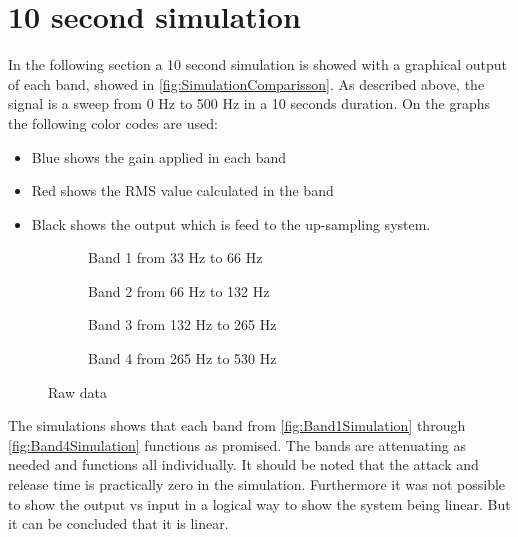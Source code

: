 \section{10 second simulation}
In the following section a 10 second simulation is showed with a graphical output of each band, showed in \autoref{fig:SimulationComparisson}. As described above, the signal is a sweep from 0 Hz to 500 Hz in a 10 seconds duration. On the graphs the following color codes are used:
\begin{itemize}
\item Blue shows the gain applied in each band
\item Red shows the RMS value calculated in the band
\item Black shows the output which is feed to the up-sampling system.
\end{itemize}

\begin{figure}[H]
\centering
\begin{subfigure}[t]{0.49\textwidth}
    \centering
    
    \caption{Band 1 from 33 Hz to 66 Hz}
    \label{fig:Band1Simulation}
\end{subfigure}
\begin{subfigure}[t]{0.49\textwidth}
    \centering
    
    \caption{Band 2 from 66 Hz to 132 Hz}
    \label{fig:Band2Simulation}
\end{subfigure}
\begin{subfigure}[t]{0.49\textwidth}
    \centering
    
    \caption{Band 3 from 132 Hz to 265 Hz}
    \label{fig:Band3Simulation}
\end{subfigure}
\begin{subfigure}[t]{0.49\textwidth}
    \centering
    
    \caption{Band 4 from 265 Hz to 530 Hz}
    \label{fig:Band4Simulation}
\end{subfigure}
\caption{Raw data}
\label{fig:SimulationComparisson}
\end{figure} 

The simulations shows that each band from \autoref{fig:Band1Simulation} through \autoref{fig:Band4Simulation} functions as promised. The bands are attenuating as needed and functions all individually. It should be noted that the attack and release time is practically zero in the simulation. Furthermore it was not possible to show the output vs input in a logical way to show the system being linear. But it can be concluded that it is linear.

 




